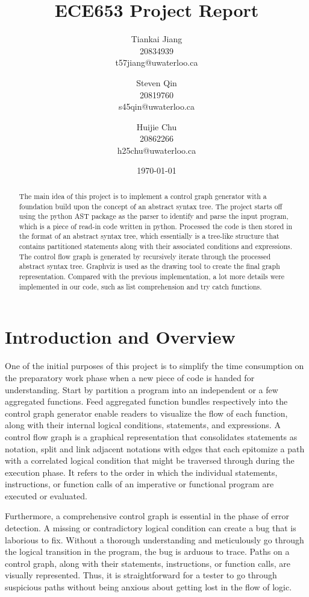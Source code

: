 \documentclass[11pt]{article}
\title{ECE653 Project Report}
\author{Tiankai Jiang\\20834939\\t57jiang@uwaterloo.ca \and Steven Qin\\20819760\\s45qin@uwaterloo.ca \and Huijie Chu\\20862266\\h25chu@uwaterloo.ca}
\date{\today}
\begin{document}
\maketitle

\begin{abstract}
The main idea of this project is to implement a control graph generator with a foundation build upon the concept of an abstract syntax tree. The project starts off using the python AST package as the parser to identify and parse the input program, which is a piece of read-in code written in python. Processed the code is then stored in the format of an abstract syntax tree, which essentially is a tree-like structure that contains partitioned statements along with their associated conditions and expressions. The control flow graph is generated by recursively iterate through the processed abstract syntax tree. Graphviz is used as the drawing tool to create the final graph representation. Compared with the previous implementation, a lot more details were implemented in our code, such as list comprehension and try catch functions.
\end{abstract}

\section{Introduction and Overview}\label{section-introduction}
One of the initial purposes of this project is to simplify the time consumption on the preparatory work phase when a new piece of code is handed for understanding. Start by partition a program into an independent or a few aggregated functions. Feed aggregated function bundles respectively into the control graph generator enable readers to visualize the flow of each function, along with their internal logical conditions, statements, and expressions. A control flow graph is a graphical representation that consolidates statements as notation, split and link adjacent notations with edges that each epitomize a path with a correlated logical condition that might be traversed through during the execution phase. It refers to the order in which the individual statements, instructions, or function calls of an imperative or functional program are executed or evaluated.

Furthermore, a comprehensive control graph is essential in the phase of error detection. A missing or contradictory logical condition can create a bug that is laborious to fix. Without a thorough understanding and meticulously go through the logical transition in the program, the bug is arduous to trace. Paths on a control graph, along with their statements, instructions, or function calls, are visually represented. Thus, it is straightforward for a tester to go through suspicious paths without being anxious about getting lost in the flow of logic.
\end{document}
